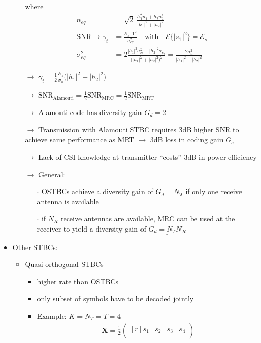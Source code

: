 \documentclass[a4paper, 10pt]{article}
\begin{document}
\begin{itemize}
\begin{itemize}
		where 
		\begin{align*}
			n_{eq} &= \sqrt{2}\;\frac{h_1^*n_1 + h_2n_2^*}{|h_1|^2 + |h_2|^2}\\
			\text{SNR} \rightarrow \gamma _t  &= \frac{\mathcal{E}_s\cdot 1^2}{\sigma _{eq}^2}\quad \text{with}\quad \mathcal{E}\bigl\{ |s_1|^2\bigr\} = \mathcal{E}_s\\ 	
			\sigma _{eq}^2 &= 2\frac{|h_1|^2\sigma _n^2 + |h_2|^2\sigma _{eq}}{\bigl(|h_1|^2 + |h_2|^2\bigr)^2} = \frac{2\sigma _n^2}{|h_1|^2 + |h_2|^2}
		\end{align*}
		\item[$\rightarrow$] $\gamma _t = \frac{1}{2}\frac{\mathcal{E}_s}{\sigma _n}\bigl ( |h_1|^2 + |h_2|^2\bigr)$
		\item[$\rightarrow$] $\text{SNR}_{\text{Alamouti}} = \frac{1}{2}\text{SNR}_{\text{MRC}} = \frac{1}{2}\text{SNR}_{\text{MRT}}$
		\item[$\rightarrow$] Alamouti code has diversity gain $G_d = 2$
		\item[$\rightarrow$] Transmission with Alamouti STBC requires 3dB higher SNR to achieve same performance as MRT $\rightarrow$  3dB loss in coding gain $G_c$
		\item[$\rightarrow$] Lack of CSI knowledge at transmitter ``costs'' 3dB in power efficiency
		\item[$\rightarrow$] General: 
		\begin{itemize}
			\item[$\cdot$] OSTBCs achieve a diversity gain of $G_d = N_T$ if only one receive antenna is available
			\item[$\cdot$] if $ N_R $ receive antennas are available, MRC can be used at the receiver to yield a diversity gain of $\underline{G_d = N_TN_R}$
		\end{itemize}
	\end{itemize}
\item Other STBCs:
	\begin{itemize}
		\item Quasi orthogonal STBCs
		\begin{itemize}
			\item higher rate than OSTBCs
			\item only subset of symbols have to be decoded jointly
			\item Example: $K = N_T = T = 4$
			\begin{align*}
				\textbf{X} = \frac{1}{2}
				\begin{pmatrix*}[r]
					s_1 & s_2 & s_3 & s_4\\

\end{pmatrix*}
\end{align*}
\end{itemize}
\end{itemize}
\end{itemize}
\end{document}
